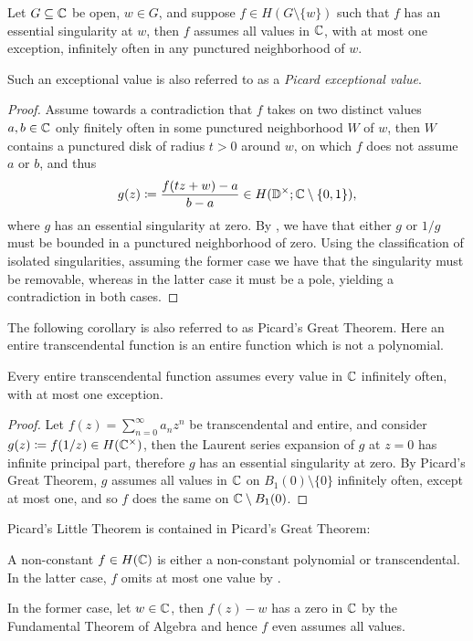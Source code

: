 \begin{theorem} \label{thm:picards-great-theorem}
    Let $G \subseteq \mathbb{C}$ be open, $w \in G$, and suppose $f \in H(G \setminus \{ w \})$ such that $f$ has an essential singularity at $w$, then $f$ assumes all values in $\mathbb{C}$, with at most one exception, infinitely often in any punctured neighborhood of $w$.
\end{theorem}

Such an exceptional value is also referred to as a \emph{Picard exceptional value}.

\begin{proof}
    Assume towards a contradiction that $f$ takes on two distinct values $a, b \in \mathbb{C}$ only finitely often in some punctured neighborhood $W$ of $w$, then $W$ contains a punctured disk of radius $t > 0$ around $w$, on which $f$ does not assume $a$ or $b$, and thus
    $$ g(z) \coloneqq \frac{f(t z + w) - a}{b - a} \in H(\mathbb{D}^\times; \mathbb{C} \setminus \{ 0, 1 \}), $$
    where $g$ has an essential singularity at zero. By , we have that either $g$ or $1/g$ must be bounded in a punctured neighborhood of zero. Using the classification of isolated singularities, assuming the former case we have that the singularity must be removable, whereas in the latter case it must be a pole, yielding a contradiction in both cases.
\end{proof}

The following corollary is also referred to as Picard's Great Theorem. Here an entire transcendental function is an entire function which is not a polynomial.

\begin{corollary} \label{cor:transcendental-every-value-inf}
    Every entire transcendental function assumes every value in $\mathbb{C}$ infinitely often, with at most one exception.
\end{corollary}

\begin{proof}
    Let $f(z) = \sum_{n=0}^\infty a_n z^n$ be transcendental and entire, and consider $g(z) \coloneqq f(1 / z) \in H(\mathbb{C}^\times)$, then the Laurent series expansion of $g$ at $z = 0$ has infinite principal part, therefore $g$ has an essential singularity at zero. By Picard's Great Theorem, $g$ assumes all values in $\mathbb{C}$ on $B_1(0) \setminus \{ 0 \}$ infinitely often, except at most one, and so $f$ does the same on $\mathbb{C} \setminus B_1(0)$.
\end{proof}

\begin{remark}
    Picard's Little Theorem is contained in Picard's Great Theorem:
    
    A non-constant $f \in H(\mathbb{C})$ is either a non-constant polynomial or transcendental. In the latter case, $f$ omits at most one value by .
    
    In the former case, let $w \in \mathbb{C}$, then $f(z) - w$ has a zero in $\mathbb{C}$ by the Fundamental Theorem of Algebra and hence $f$ even assumes all values.
\end{remark}